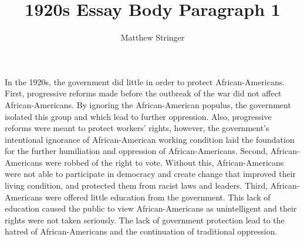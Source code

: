 \documentclass[14pt]{extarticle}
\title{1920s Essay Body Paragraph 1}
\author{Matthew Stringer}
\begin{document}
    \maketitle
    In the 1920s, the government did little in order to protect African-Americans.
% 
    First, progressive reforms made before the outbreak of the war did not affect 
    African-Americans. By ignoring the African-American populus, the government 
    isolated this group and which lead to further oppression. Also, progressive
    reforms were meant to protect workers' rights, however, the government's 
    intentional ignorance of African-American working condition laid the foundation
    for the further humiliation and oppression of African-Americans.
% 
    Second, African-Americans were robbed of the right to vote.
    Without this, African-Americans were not able to participate in democracy and 
    create change that improved their living condition, and protected them from racist
    laws and leaders.
% 
    Third, African-Americans were offered little education from the government.
    This lack of education caused the public to view African-Americans as unintelligent 
    and their rights were not taken seriously.
% 
    The lack of government protection lead to the hatred of African-Americans and 
    the continuation of traditional oppression.
\end{document}
